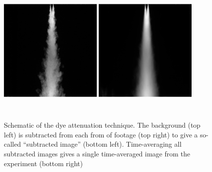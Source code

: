 \documentclass{jfm}
\begin{document}
\begin{figure}
		\vspace{0.5em}
		\includegraphics[trim = {0cm, 0cm, 0cm, 0cm}, clip, width = 0.45\textwidth, height = 2.6in, angle = 180]{frame650cleaned.eps}
		\hspace{1em}
		\includegraphics[trim = {0cm, 0cm, 0cm, 0cm}, clip, width = 0.45\textwidth, height = 2.6in, angle = 180]{twoPlumeAveraged.eps}
		\caption{Schematic of the dye attenuation technique. The background (top left) is subtracted from each from of footage (top right) to give a so-called ``subtracted image'' (bottom left). Time-averaging all subtracted images gives a single time-averaged image from the experiment (bottom right) }
		\label{fig:dyeAttenuation}
	\end{figure}
	
	
	
\end{document}
